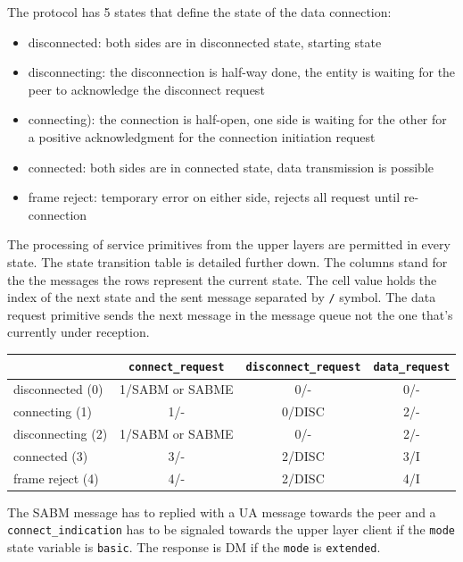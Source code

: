 \documentclass[a4paper]{article}
\begin{document}
The protocol has 5 states that define the state of the data connection:
\begin{itemize}
\item disconnected: both sides are in disconnected state, starting state
\item disconnecting: the disconnection is half-way done, the entity is waiting for the peer to acknowledge the disconnect request
\item connecting): the connection is half-open, one side is waiting for the other for a positive acknowledgment for the connection initiation request
\item connected: both sides are in connected state, data transmission is possible
\item frame reject: temporary error on either side, rejects all request until re-connection
\end{itemize}

The processing of service primitives from the upper layers are permitted in every state. The state transition table is detailed further down. The columns stand for the the messages the rows represent the current state. The cell value holds the index of the next state and the sent message separated by \verb./. symbol. The data request primitive sends the next message in the message queue not the one that's currently under reception.

{\footnotesize
\begin{center}
\begin{tabular}{|l|c|c|c|}
\hline
  &\verb!connect_request!&\verb!disconnect_request!&\verb!data_request!\\
\hline
 disconnected (0)& 1/SABM or SABME& 0/-& 0/-\\
\hline
 connecting (1) & 1/- & 0/DISC & 2/-\\
\hline
 disconnecting (2) & 1/SABM or SABME& 0/-& 2/-\\
\hline
 connected (3) & 3/-& 2/DISC& 3/I\\
\hline
 frame reject (4) & 4/- & 2/DISC& 4/I\\
\hline
\end{tabular}
\end{center}
}

The SABM message has to replied with a UA message towards the peer and a \verb!connect_indication! has to be signaled towards the upper layer client if the \verb!mode! state variable is \verb/basic/. The response is DM if the \verb!mode! is \verb/extended/.
\end{document}
